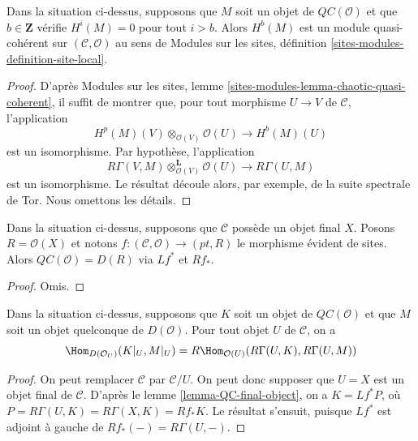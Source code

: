 \begin{lemma}
\label{lemma-QC-bounded-above}
Dans la situation ci-dessus, supposons que $M$ soit un objet de
$\mathit{QC}(\mathcal{O})$ et que $b \in \mathbf{Z}$ vérifie $H^i(M) = 0$ pour
tout $i > b$. Alors $H^b(M)$ est un module quasi-cohérent sur
$(\mathcal{C}, \mathcal{O})$ au sens de Modules sur les sites, définition
\ref{sites-modules-definition-site-local}.
\end{lemma}

\begin{proof}
D'après Modules sur les sites, lemme
\ref{sites-modules-lemma-chaotic-quasi-coherent}, il suffit de montrer que,
pour tout morphisme $U \to V$ de $\mathcal{C}$, l'application
$$
H^p(M)(V) \otimes_{\mathcal{O}(V)} \mathcal{O}(U) \to H^b(M)(U)
$$
est un isomorphisme. Par hypothèse, l'application
$$
R\Gamma(V, M) \otimes_{\mathcal{O}(V)}^\mathbf{L} \mathcal{O}(U)
\to R\Gamma(U, M)
$$
est un isomorphisme. Le résultat découle alors, par exemple, de la suite
spectrale de Tor. Nous omettons les détails.
\end{proof}

\begin{lemma}
\label{lemma-QC-final-object}
Dans la situation ci-dessus, supposons que $\mathcal{C}$ possède un objet
final $X$. Posons $R = \mathcal{O}(X)$ et notons
$f : (\mathcal{C}, \mathcal{O}) \to (pt, R)$ le morphisme évident de sites.
Alors $\mathit{QC}(\mathcal{O}) = D(R)$ via $Lf^*$ et $Rf_*$.
\end{lemma}

\begin{proof}
Omis.
\end{proof}

\begin{lemma}
\label{lemma-QC-hom-out-of}
Dans la situation ci-dessus, supposons que $K$ soit un objet de
$\mathit{QC}(\mathcal{O})$ et que $M$ soit un objet quelconque de
$D(\mathcal{O})$. Pour tout objet $U$ de $\mathcal{C}$, on a
$$
\Hom_{D(\mathcal{O}_U)}(K|_U, M|_U) =
R\Hom_{\mathcal{O}(U)}(R\Gamma(U, K), R\Gamma(U, M))
$$
\end{lemma}

\begin{proof}
On peut remplacer $\mathcal{C}$ par $\mathcal{C}/U$. On peut donc supposer
que $U = X$ est un objet final de $\mathcal{C}$. D'après le lemme
\ref{lemma-QC-final-object}, on a $K = Lf^*P$, où
$P = R\Gamma(U, K) = R\Gamma(X, K) = Rf_*K$. Le résultat s'ensuit, puisque
$Lf^*$ est adjoint à gauche de $Rf_*(-) = R\Gamma(U, -)$.
\end{proof}

